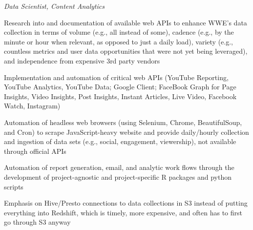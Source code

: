 \vspace{-0.4em}
\textit{Data Scientist, Content Analytics} 
\vspace{-0.8em}
\begin{itemize*}
  \item Research into and documentation of available web APIs to enhance 
    WWE's data collection in terms of volume (e.g., all instead of some), 
    cadence (e.g., by the minute or hour when relevant, as opposed to just
    a daily load), variety (e.g., countless metrics and user data 
    opportunities that were not yet being leveraged), and independence from 
    expensive 3rd party vendors
  \item Implementation and automation of critical web APIs (YouTube Reporting, 
    YouTube Analytics, YouTube Data; Google Client; FaceBook Graph for 
    Page Insights, Video Insights,
    Post Insights, Instant Articles, Live Video, Facebook Watch, 
    Instagram) 
  \item Automation of headless web browsers (using Selenium, Chrome,
    BeautifulSoup, and Cron) to scrape JavaScript-heavy website
    and provide daily/hourly collection and
    ingestion of data sets (e.g., social, engagement, viewership), 
    not available through official APIs
  \item  Automation of report generation, email, and analytic work flows
    through the development of project-agnostic and project-specific R packages 
    and python scripts 
  \item Emphasis on Hive/Presto connections to data collections in S3 instead
    of putting everything into Redshift, which is timely, more expensive, and
    often has to first go through S3 anyway
\end{itemize*}

